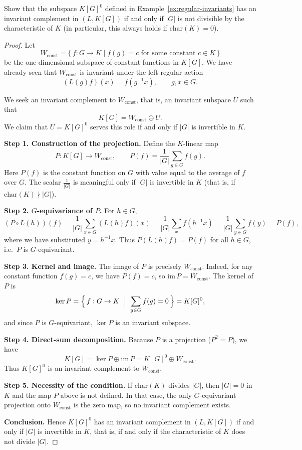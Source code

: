 \begin{exercise}[1.2.3]\label{ex:1.2.3}
Show that the subspace $K[G]^0$ defined in Example~\ref{ex:regular-invariants}
has an invariant complement in $(L,K[G])$ if and only if $|G|$ is not divisible by the characteristic of $K$
(in particular, this always holds if $\mathrm{char}(K)=0$).
\end{exercise}

\begin{proof}
Let
\[
W_{\mathrm{const}}=\{\,f:G\to K \mid f(g)=c \text{ for some constant } c\in K\,\}
\]
be the one-dimensional subspace of constant functions in $K[G]$.
We have already seen that $W_{\mathrm{const}}$ is invariant under the left regular action
\[
(L(g)f)(x)=f(g^{-1}x), \qquad g,x\in G.
\]

We seek an invariant complement to $W_{\mathrm{const}}$,
that is, an invariant subspace $U$ such that
\[
K[G]=W_{\mathrm{const}}\oplus U.
\]
We claim that $U=K[G]^0$ serves this role if and only if $|G|$ is invertible in $K$.

\medskip
\noindent\textbf{Step 1. Construction of the projection.}
Define the $K$-linear map
\[
P:K[G]\longrightarrow W_{\mathrm{const}},\qquad
P(f)=\frac{1}{|G|}\sum_{g\in G} f(g).
\]
Here $P(f)$ is the constant function on $G$ with value equal to the average of $f$ over $G$.
The scalar $\tfrac{1}{|G|}$ is meaningful only if $|G|$ is invertible in $K$ (that is, if $\mathrm{char}(K)\nmid |G|$).

\medskip
\noindent\textbf{Step 2. $G$-equivariance of $P$.}
For $h\in G$,
\[
(P\circ L(h))(f)
  = \frac{1}{|G|}\sum_{x\in G}(L(h)f)(x)
  = \frac{1}{|G|}\sum_{x} f(h^{-1}x)
  = \frac{1}{|G|}\sum_{y\in G}f(y)
  = P(f),
\]
where we have substituted $y=h^{-1}x$.
Thus $P(L(h)f)=P(f)$ for all $h\in G$, i.e.\ $P$ is $G$-equivariant.

\medskip
\noindent\textbf{Step 3. Kernel and image.}
The image of $P$ is precisely $W_{\mathrm{const}}$.
Indeed, for any constant function $f(g)=c$, we have $P(f)=c$, so $\mathrm{im}\,P=W_{\mathrm{const}}$.
The kernel of $P$ is
\[
\ker P=\Bigl\{\,f:G\to K \ \Bigm|\  \sum_{g\in G}f(g)=0\,\Bigr\}=K[G]^0,
\]
and since $P$ is $G$-equivariant, $\ker P$ is an invariant subspace.

\medskip
\noindent\textbf{Step 4. Direct-sum decomposition.}
Because $P$ is a projection ($P^2=P$), we have
\[
K[G]=\ker P\oplus\mathrm{im}\,P
      =K[G]^0\oplus W_{\mathrm{const}}.
\]
Thus $K[G]^0$ is an invariant complement to $W_{\mathrm{const}}$.

\medskip
\noindent\textbf{Step 5. Necessity of the condition.}
If $\mathrm{char}(K)$ divides $|G|$, then $|G|=0$ in $K$ and the map $P$ above is not defined.
In that case, the only $G$-equivariant projection onto $W_{\mathrm{const}}$ is the zero map,
so no invariant complement exists.

\medskip
\noindent\textbf{Conclusion.}
Hence $K[G]^0$ has an invariant complement in $(L,K[G])$ if and only if $|G|$ is invertible in $K$,
that is, if and only if the characteristic of $K$ does not divide $|G|$.
\end{proof}


